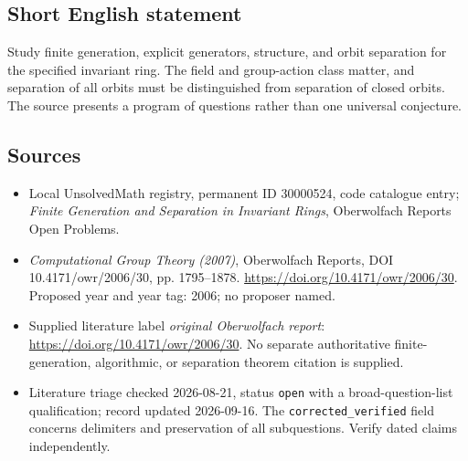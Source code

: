 \documentclass[11pt]{article}
\begin{document}
\subsection{Short English statement}
Study finite generation, explicit generators, structure, and orbit separation for the specified invariant ring. The field and group-action class matter, and separation of all orbits must be distinguished from separation of closed orbits. The source presents a program of questions rather than one universal conjecture.
\subsection{Sources}
\begin{itemize}\item Local UnsolvedMath registry, permanent ID 30000524, code catalogue entry; \emph{Finite Generation and Separation in Invariant Rings}, Oberwolfach Reports Open Problems.\item \emph{Computational Group Theory (2007)}, Oberwolfach Reports, DOI 10.4171/owr/2006/30, pp. 1795--1878. \url{https://doi.org/10.4171/owr/2006/30}. Proposed year and year tag: 2006; no proposer named.\item Supplied literature label \emph{original Oberwolfach report}: \url{https://doi.org/10.4171/owr/2006/30}. No separate authoritative finite-generation, algorithmic, or separation theorem citation is supplied.\item Literature triage checked 2026-08-21, status \texttt{open} with a broad-question-list qualification; record updated 2026-09-16. The \texttt{corrected\_verified} field concerns delimiters and preservation of all subquestions. Verify dated claims independently.\end{itemize}
\end{document}
